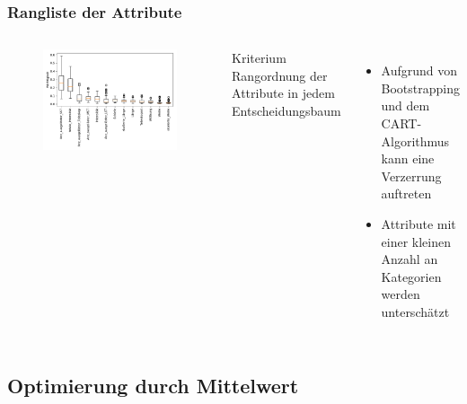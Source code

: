 \documentclass[aspectratio=1610, professionalfonts, 9pt]{beamer}
\begin{document}
  \begin{frame}
    \frametitle{Rangliste der Attribute}
    \begin{columns}
      \begin{figure}
        \includegraphics[width=\textwidth]{pictures/feautureimportance_boxplot_firstForest.pdf}
        \caption{}
        \label{}
      \end{figure}
      \begin{block}{Kriterium}
        Rangordnung der Attribute in jedem Entscheidungsbaum
      \end{block}
      \begin{itemize}
        \item Aufgrund von Bootstrapping und dem CART-Algorithmus kann eine Verzerrung auftreten
        \item Attribute mit einer kleinen Anzahl an Kategorien werden unterschätzt
      \end{itemize}
    \end{columns}
  \end{frame}

  \subsection{Optimierung durch Mittelwert}
\end{document}
